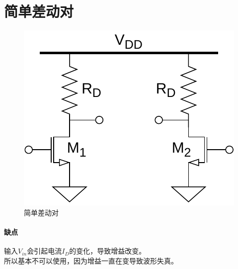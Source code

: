 \documentclass[twoside,a4paper,openright,titlepage,draft]{ctexrep}
\begin{document}
\section{简单差动对}
\begin{multicols}{2}
    \begin{figure}[H]
        \centering
        \includegraphics[width=0.8\columnwidth]{simpledifferentialpair.drawio.pdf}
        \caption{简单差动对}
        \label{fig:简单差动对}
    \end{figure}
    \columnbreak
    \paragraph{缺点}
    输入$V_{in}$会引起电流$I_D$的变化，导致增益改变。\\
    所以基本不可以使用，因为增益一直在变导致波形失真。
\end{multicols}
\end{document}
